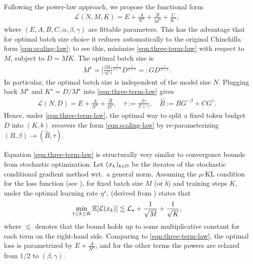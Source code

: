 \documentclass[12pt,a4paper,twoside]{article}
\begin{document}
Following the power-law approach, we propose the functional form 
\begin{align}\label{eqn:three-term-law}
    \mathcal{L}(N,M,K) = E + \frac{A}{N^\alpha} + \frac{B}{M^\beta} + \frac{C}{K^\gamma},
\end{align}
where $(E,A,B,C,\alpha,\beta,\gamma)$ are fittable parameters. This has the advantage that for optimal batch size choice it reduces automatically to the original Chinchilla form \eqref{eqn:scaling-law}: to see this, minimize \eqref{eqn:three-term-law} with respect to $M$, subject to $D=MK$. The optimal batch size is
\begin{align}\label{eqn:opt-batch-size}
    M^\star = \Big[\frac{\beta B}{\gamma C}\Big]^{\frac{1}{\beta + \gamma}} D^\frac{\gamma}{\beta + \gamma}=:GD^\frac{\gamma}{\beta + \gamma}.
\end{align}
In particular, the optimal batch size is independent of the model size $N$. Plugging back $M^\star$ and $K^\star = D/M^\star$ into \eqref{eqn:three-term-law} gives 
\begin{align}\label{eqn:three-term-optimal}
    \mathcal{L}(N,D) = E + \frac{A}{N^\alpha} + \frac{\hat B}{D^\tau}, \quad \tau:= \frac{\beta \gamma}{\beta + \gamma}, \quad \hat{B} := BG^{-\beta}+ CG^{\gamma}.
\end{align}
Hence, under \eqref{eqn:three-term-law}, the optimal way to split a fixed token budget $D$ into $(K, b)$ recovers the form \eqref{eqn:scaling-law} by re-parameterizing $(B, \beta) \to (\hat B, \tau)$.

Equation \eqref{eqn:three-term-law} is structurally very similar to convergence bounds from stochastic optimization. Let $(x_k)_{k \in \mathbb{N}}$ be the iterates of the stochastic conditional gradient method wrt.\ a general norm. Assuming the $\mu$-KL condition for the loss function (see \citet{Islamov2026}), for fixed batch size $M$ (or $b$) and training steps $K$, under the optimal learning rate $\eta^\star$, \citet[Thm.\ 1]{Shulgin2026} (derived from \citet{Kovalev2025}) states that
\begin{align*}
    \min_{1\leq k \leq K} \mathbb{E}[\mathcal{L}(x_k)]  \lesssim \mathcal{L}_\star +  \frac{1}{\sqrt{M}} + \frac{1}{\sqrt{K}},
\end{align*}
where $\lesssim$ denotes that the bound holds up to some multiplicative constant for each term on the right-hand side. Comparing to \eqref{eqn:three-term-law}, the optimal loss is parametrized by $E+\frac{A}{N^\alpha}$, and for the other terms the powers are relaxed from $1/2$ to $(\beta,\gamma)$.
\end{document}
